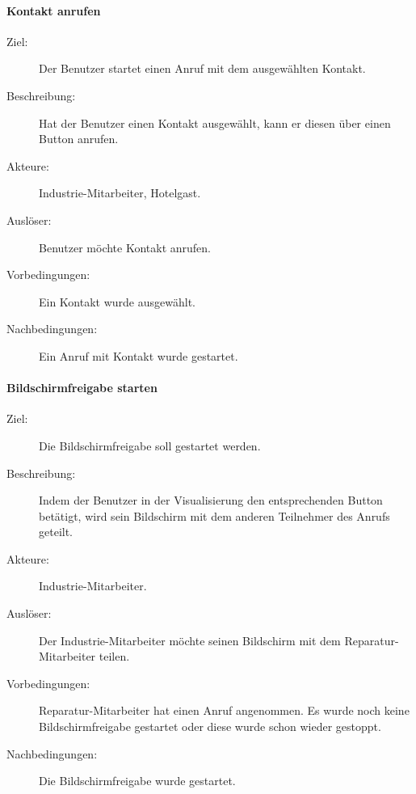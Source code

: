 \paragraph{\large{Kontakt anrufen}}
    \begin{description}
        \item[Ziel:] Der Benutzer startet einen Anruf mit dem ausgewählten Kontakt.
        \item[Beschreibung:] Hat der Benutzer einen Kontakt ausgewählt, kann er diesen über einen Button anrufen.
        \item[Akteure:] Industrie-Mitarbeiter, Hotelgast.
        \item[Auslöser:] Benutzer möchte Kontakt anrufen.
        \item[Vorbedingungen:] Ein Kontakt wurde ausgewählt.
        \item[Nachbedingungen:] Ein Anruf mit Kontakt wurde gestartet.
    \end{description}

\paragraph{\large{Bildschirmfreigabe starten}}
    \begin{description}
        \item[Ziel:] Die Bildschirmfreigabe soll gestartet werden.
        \item[Beschreibung:] Indem der Benutzer in der Visualisierung den entsprechenden Button betätigt, wird sein Bildschirm mit dem anderen Teilnehmer des Anrufs geteilt.
        \item[Akteure:] Industrie-Mitarbeiter.
        \item[Auslöser:] Der Industrie-Mitarbeiter möchte seinen Bildschirm mit dem Reparatur-Mitarbeiter teilen.
        \item[Vorbedingungen:] Reparatur-Mitarbeiter hat einen Anruf angenommen.
            Es wurde noch keine Bildschirmfreigabe gestartet oder diese wurde schon wieder gestoppt.
        \item[Nachbedingungen:] Die Bildschirmfreigabe wurde gestartet.
    \end{description}

